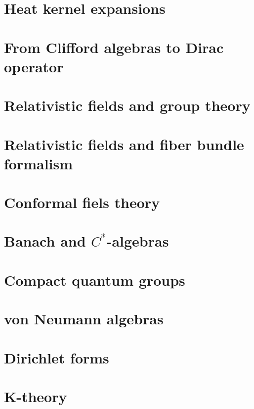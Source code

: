 \chapter{Heat kernel expansions}


\chapter{From Clifford algebras to Dirac operator}



\chapter{Relativistic fields and group theory}


\chapter{Relativistic fields and fiber bundle formalism}


\chapter{Conformal fiels theory}


\chapter{Banach and \texorpdfstring{$C^*$}{C*}-algebras}
   
   
   

\chapter{Compact quantum groups}


\chapter{von Neumann algebras}





\chapter{Dirichlet forms}


\chapter{K-theory}


